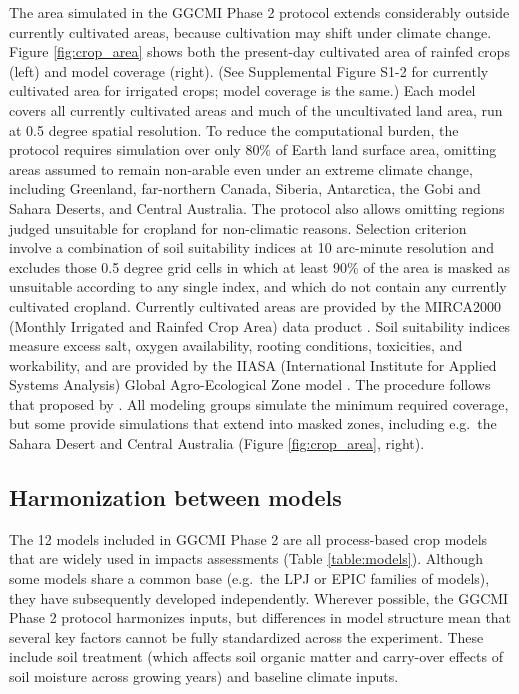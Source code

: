 \documentclass[gmd, manuscript]{copernicus} %
\begin{document}
The area simulated in the GGCMI Phase 2 protocol extends considerably outside currently cultivated areas, because cultivation may shift under climate change.
Figure \ref{fig:crop_area} shows both the present-day cultivated area of rainfed crops (left) and model coverage (right).
 (See Supplemental Figure S1-2 for currently cultivated area for irrigated crops; model coverage is the same.) 
Each model covers all currently cultivated areas and much of the uncultivated land area, run at 0.5 degree spatial resolution. 
To reduce the computational burden, the protocol requires simulation over only 80\% of Earth land surface area, omitting  areas assumed to remain non-arable even under an extreme climate change, including Greenland, far-northern Canada, Siberia, Antarctica, the Gobi and Sahara Deserts, and Central Australia.
The protocol also allows omitting regions judged unsuitable for cropland for non-climatic reasons. 
Selection criterion involve a combination of soil suitability indices at 10 arc-minute resolution and excludes those 0.5 degree grid cells in which at least 90\% of the area is masked as unsuitable according to any single index, and which do not contain any currently cultivated cropland. 
Currently cultivated areas are provided by the MIRCA2000 (Monthly Irrigated and Rainfed Crop Area) data product \citep{Portmann2010}.
Soil suitability indices measure excess salt, oxygen availability, rooting conditions, toxicities, and workability, and are provided by the IIASA (International Institute for Applied Systems Analysis) Global Agro-Ecological Zone model \citep[GAEZ, ][]{gaez}. 
The procedure follows that proposed by \citet{pugh_climate_2016}. 
All modeling groups simulate the minimum required coverage, but some provide simulations that extend into masked zones, including e.g.\ the Sahara Desert and Central Australia (Figure \ref{fig:crop_area}, right).

\subsection{Harmonization between models}
The 12 models included in GGCMI Phase 2 are all process-based crop models that are widely used in impacts assessments (Table \ref{table:models}).
Although some models share a common base (e.g.\ the LPJ or EPIC families of models), they have subsequently developed independently.  
Wherever possible, the GGCMI Phase 2 protocol harmonizes inputs, but differences in model structure mean that several key factors cannot be fully standardized across the experiment. 
These include soil treatment (which affects soil organic matter and carry-over effects of soil moisture across growing years) and baseline climate inputs.  
\end{document}
